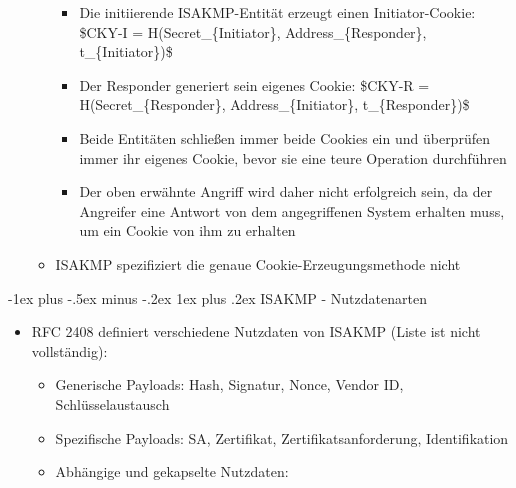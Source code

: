 \documentclass[a4paper]{article}
\makeatletter
\renewcommand{\subsubsection}{\@startsection{subsubsection}{3}{0mm}%
 {-1ex plus -.5ex minus -.2ex}%
 {1ex plus .2ex}%
 {\normalfont\small\bfseries}}
\makeatother
\begin{document}
\begin{multicols}{3}
\begin{itemize}
\begin{itemize}
                        \begin{itemize}
                            \item
                                  Die initiierende ISAKMP-Entität erzeugt einen Initiator-Cookie:
                                  \$CKY-I = H(Secret\_\{Initiator\}, Address\_\{Responder\},
                                  t\_\{Initiator\})\$
                            \item
                                  Der Responder generiert sein eigenes Cookie: \$CKY-R =
                                  H(Secret\_\{Responder\}, Address\_\{Initiator\},
                                  t\_\{Responder\})\$
                            \item
                                  Beide Entitäten schließen immer beide Cookies ein und überprüfen
                                  immer ihr eigenes Cookie, bevor sie eine teure Operation
                                  durchführen
                            \item
                                  Der oben erwähnte Angriff wird daher nicht erfolgreich sein, da
                                  der Angreifer eine Antwort von dem angegriffenen System erhalten
                                  muss, um ein Cookie von ihm zu erhalten
                        \end{itemize}
                  \item
                        ISAKMP spezifiziert die genaue Cookie-Erzeugungsmethode nicht
              \end{itemize}
    \end{itemize}


    \subsubsection{ISAKMP - Nutzdatenarten}

    \begin{itemize}
        \item
              RFC 2408 definiert verschiedene Nutzdaten von ISAKMP (Liste ist nicht
              vollständig):

              \begin{itemize}
                  \item
                        Generische Payloads: Hash, Signatur, Nonce, Vendor ID,
                        Schlüsselaustausch
                  \item
                        Spezifische Payloads: SA, Zertifikat, Zertifikatsanforderung,
                        Identifikation
                  \item
                        Abhängige und gekapselte Nutzdaten:


\end{itemize}
\end{itemize}
\end{multicols}
\end{document}
